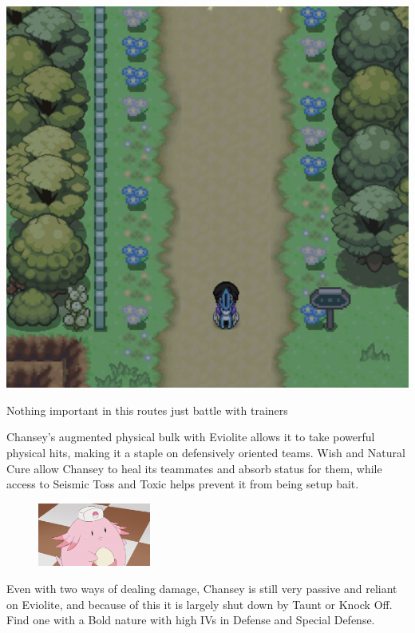 \documentclass[11pt]{article}
\begin{document}
\includegraphics[width=\textwidth]{walkthrough/Sinnoh/Route_209}

Nothing important in this routes just battle with trainers



% 


\begin{mdframed}[style=MyFrame,nobreak=true,frametitle={Pokemon Spotlight: Chansey}]

Chansey's augmented physical bulk with Eviolite allows it to take powerful physical hits,
making it a staple on defensively oriented teams.
Wish and Natural Cure allow Chansey to heal its teammates and absorb status for them,
while access to Seismic Toss and Toxic helps prevent it from being setup bait.

\begin{figure}
\includegraphics[width=0.33\textwidth]{walkthrough/Sinnoh/spotlight-chansey}
\label{fig:spotlight-chansey}
\end{figure}

Even with two ways of dealing damage, Chansey is still very passive and reliant on
Eviolite, and because of this it is largely shut down by Taunt or Knock Off.
Find one with a Bold nature with high IVs in Defense and Special Defense.

\end{mdframed}
\end{document}
